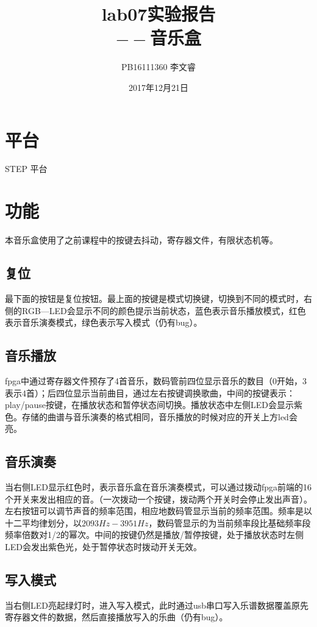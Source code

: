 \documentclass{ctexart}
\begin{document}
\title{%
	lab07实验报告 \\
	\large{$--$音乐盒}}
	\author{PB16111360 李文睿}
	\date{2017年12月21日}
	\maketitle
	\tableofcontents
	\section{平台}
	STEP 平台
	\section{功能}
	本音乐盒使用了之前课程中的按键去抖动，寄存器文件，有限状态机等。
	\subsection{复位}
	最下面的按钮是复位按钮。最上面的按键是模式切换键，切换到不同的模式时，右侧的RGB—LED会显示不同的颜色提示当前状态，蓝色表示音乐播放模式，红色表示音乐演奏模式，绿色表示写入模式（仍有bug）。
	\subsection{音乐播放}
	fpga中通过寄存器文件预存了4首音乐，数码管前四位显示音乐的数目（0开始，3表示4首）；后四位显示当前曲目，通过左右按键调换歌曲，中间的按键表示：play/pause按键，在播放状态和暂停状态间切换。播放状态中左侧LED会显示紫色。存储的曲谱与音乐演奏的格式相同，音乐播放的时候对应的开关上方led会亮。
	\subsection{音乐演奏}
	当右侧LED显示红色时，表示音乐盒在音乐演奏模式，可以通过拨动fpga前端的16个开关来发出相应的音。（一次拨动一个按键，拨动两个开关时会停止发出声音）。左右按钮可以调节声音的频率范围，相应地数码管显示当前的频率范围。频率是以十二平均律划分，以$2093Hz - 3951Hz$，数码管显示的为当前频率段比基础频率段频率倍数对1/2的幂次。中间的按键仍然是播放/暂停按键，处于播放状态时左侧LED会发出紫色光，处于暂停状态时拨动开关无效。
	\subsection{写入模式}
	当右侧LED亮起绿灯时，进入写入模式，此时通过usb串口写入乐谱数据覆盖原先寄存器文件的数据，然后直接播放写入的乐曲（仍有bug）。
\end{document}

